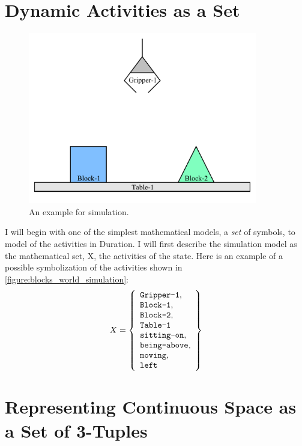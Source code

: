 \section{Dynamic Activities as a Set}

\begin{figure}
\includegraphics[width=10cm]{gfx/blocks_world_simulation}
\caption{An example for simulation.}
\label{figure:blocks_world_simulation}
\end{figure}

I will begin with one of the simplest mathematical models, a
\emph{set} of symbols, to model of the activities in Duration.  I will
first describe the simulation model as the mathematical set, X, the
activities of the state.  Here is an example of a possible
symbolization of the activities shown in
{\mbox{\autoref{figure:blocks_world_simulation}}}:
\begin{equation}
\label{equation:example_initial_state}
X =
  \left\{
    \begin{array}{l}
      \text{{\tt{Gripper-1}}}, \\
      \text{{\tt{Block-1}}}, \\
      \text{{\tt{Block-2}}}, \\
      \text{{\tt{Table-1}}} \\
      \text{{\tt{sitting-on}}}, \\
      \text{{\tt{being-above}}}, \\
      \text{{\tt{moving}}}, \\
      \text{{\tt{left}}}
    \end{array}
  \right\}
\end{equation}

\section{Representing Continuous Space as a Set of 3-Tuples}

